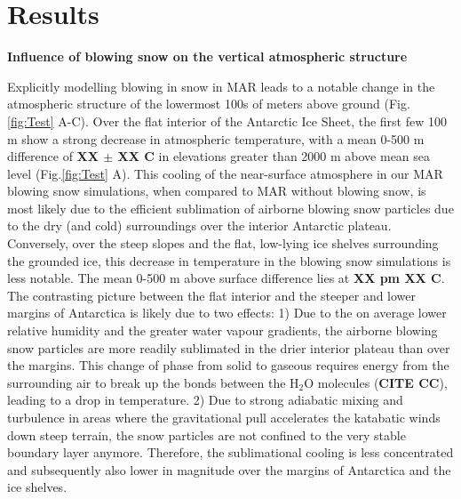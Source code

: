 \documentclass[12pt]{article}
\begin{document}
\section*{Results}


\textbf{Influence of blowing snow on the vertical atmospheric structure}

Explicitly modelling blowing in snow in MAR leads to a notable change in the atmospheric structure of the lowermost 100s of meters above ground (Fig.\ref{fig:Test} A-C). Over the flat interior of the Antarctic Ice Sheet, the first few 100 m show a strong decrease in atmospheric temperature, with a mean 0-500 m difference of \textbf{XX $\pm$ XX \textdegree C} in elevations greater than 2000 m above mean sea level (Fig.\ref{fig:Test} A). This cooling of the near-surface atmosphere in our MAR blowing snow simulations, when compared to MAR without blowing snow, is most likely due to the efficient sublimation of airborne blowing snow particles due to the dry (and cold) surroundings over the interior Antarctic plateau. Conversely, over the steep slopes and the flat, low-lying ice shelves surrounding the grounded ice, this decrease in temperature in the blowing snow simulations is less notable. The mean 0-500 m above surface difference lies at \textbf{XX pm XX \textdegree C}. The contrasting picture between the flat interior and the steeper and lower margins of Antarctica is likely due to two effects: 1) Due to the on average lower relative humidity and the greater water vapour gradients, the airborne blowing snow particles are more readily sublimated in the drier interior plateau than over the margins. This change of phase from solid to gaseous requires energy from the surrounding air to break up the bonds between the H$_2$O molecules (\textbf{CITE CC}), leading to a drop in temperature. 2) Due to strong adiabatic mixing and turbulence in areas where the gravitational pull accelerates the katabatic winds down steep terrain, the snow particles are not confined to the very stable boundary layer anymore. Therefore, the sublimational cooling is less concentrated and subsequently also lower in magnitude over the margins of Antarctica and the ice shelves.
\end{document}
